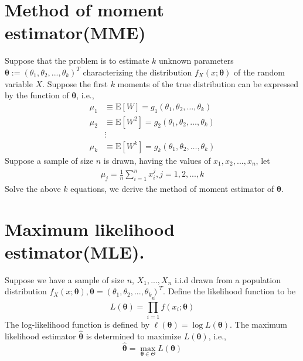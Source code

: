 \documentclass[
]{book}
\theoremstyle{definition}
\theoremstyle{definition}
\theoremstyle{definition}
\theoremstyle{remark}
\begin{document}
\hypertarget{method-of-moment-estimatormme}{%
\section{Method of moment estimator(MME)}\label{method-of-moment-estimatormme}}

Suppose that the problem is to estimate \(k\) unknown parameters \(\boldsymbol{\theta} := (\theta_1,\theta_2,...,\theta_k)^{T}\) characterizing the distribution \(f_X(x;\boldsymbol{\theta})\) of the random variable \(X\). Suppose the first \(k\) moments of the true distribution can be expressed by the function of \(\boldsymbol{\theta}\), i.e.,
\begin{align}
\mu_{1} & \equiv \mathrm{E}[W]=g_{1}\left(\theta_{1}, \theta_{2}, \ldots, \theta_{k}\right) \\
\mu_{2} & \equiv \mathrm{E}\left[W^{2}\right]=g_{2}\left(\theta_{1}, \theta_{2}, \ldots, \theta_{k}\right) \\
& \vdots \\
\mu_{k} & \equiv \mathrm{E}\left[W^{k}\right]=g_{k}\left(\theta_{1}, \theta_{2}, \ldots, \theta_{k}\right)
\end{align}
Suppose a sample of size \(n\) is drawn, having the values of \(x_1,x_2,...,x_n\), let
\begin{align}
\mu_j = \frac{1}{n}\sum_{i=1}^n x_i^j, j=1,2,...,k
\end{align}
Solve the above \(k\) equations, we derive the method of moment estimator of \(\boldsymbol{\theta}\).

\hypertarget{maximum-likelihood-estimatormle.}{%
\section{Maximum likelihood estimator(MLE).}\label{maximum-likelihood-estimatormle.}}

Suppose we have a sample of size \(n\), \(X_1,...,X_n\) i.i.d drawn from a population distribution \(f_X(x;\boldsymbol{\theta}), \boldsymbol{\theta} = (\theta_1,\theta_2,...,\theta_k)^{T}\). Define the likelihood function to be
\[
L(\boldsymbol\theta) = \prod_{i=1}^n f(x_i;\boldsymbol{\theta})
\]
The log-likelihood function is defined by \(\ell(\boldsymbol\theta)=\log L(\boldsymbol\theta)\). The maximum likelihood estimator \(\hat{\boldsymbol\theta}\) is determined to maximize \(L(\boldsymbol\theta)\), i.e.,
\begin{equation}
\hat{\boldsymbol\theta} =\underset{\boldsymbol\theta\in \Theta}{\max} L(\boldsymbol\theta)
\end{equation}
\end{document}
